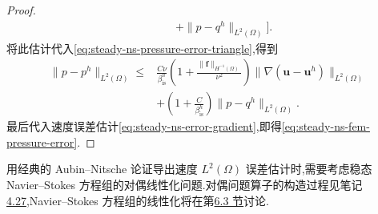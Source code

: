 \begin{proof}
\[\begin{aligned}
        &\qquad+\|p-q^h\|_{L^2(\Omega)}\Biggr].
\end{aligned}
\]
将此估计代入\cref{eq:steady-ns-pressure-error-triangle},得到
\[
\begin{aligned}
  \|p-p^h\|_{L^2(\Omega)}
   \le{}&\frac{C\nu}{\beta_{\mathrm{is}}^h}
       \left(1+\frac{\|\bm{f}\|_{H^{-1}(\Omega)}}{\nu^2}\right)
       \|\nabla(\bm{u}-\bm{u}^h)\|_{L^2(\Omega)}\\
      &+\left(1+\frac{C}{\beta_{\mathrm{is}}^h}\right)
       \|p-q^h\|_{L^2(\Omega)}.
\end{aligned}
\]
最后代入速度误差估计\cref{eq:steady-ns-error-gradient},即得\cref{eq:steady-ns-fem-pressure-error}.
\end{proof}

\begin{note}[对偶线性化问题]\label{note:steady-ns-dual-linearized-problem}
用经典的 Aubin--Nitsche 论证导出速度 $L^2(\Omega)$ 误差估计时,需要考虑稳态 Navier--Stokes 方程组的对偶线性化问题.对偶问题算子的构造过程见笔记\hyperref[note:stokes-regular-dual-problem]{4.27},Navier--Stokes 方程组的线性化将在第\hyperref[sec:steady-ns-iterations]{6.3 节}讨论.


\end{note}
